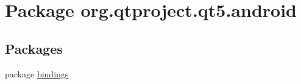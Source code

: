 \hypertarget{namespaceorg_1_1qtproject_1_1qt5_1_1android}{}\section{Package org.\+qtproject.\+qt5.\+android}
\label{namespaceorg_1_1qtproject_1_1qt5_1_1android}
\subsection*{Packages}
\begin{DoxyCompactItemize}
\item 
package \hyperlink{namespaceorg_1_1qtproject_1_1qt5_1_1android_1_1bindings}{bindings}
\end{DoxyCompactItemize}
